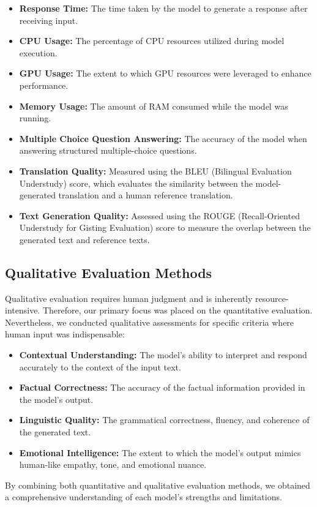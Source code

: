 \begin{itemize}
    \item \textbf{Response Time:} The time taken by the model to generate a response after receiving input.
    \item \textbf{CPU Usage:} The percentage of CPU resources utilized during model execution.
    \item \textbf{GPU Usage:} The extent to which GPU resources were leveraged to enhance performance.
    \item \textbf{Memory Usage:} The amount of RAM consumed while the model was running.
    \item \textbf{Multiple Choice Question Answering:} The accuracy of the model when answering structured multiple-choice questions.
    \item \textbf{Translation Quality:} Measured using the BLEU (Bilingual Evaluation Understudy) score, which evaluates the similarity between the model-generated translation and a human reference translation. \cite{BLUE-Score-Wikipedia}
    \item \textbf{Text Generation Quality:} Assessed using the ROUGE (Recall-Oriented Understudy for Gisting Evaluation) score to measure the overlap between the generated text and reference texts.
\end{itemize}

\cite{ROUGE-BLUE-Score}

\subsection{Qualitative Evaluation Methods}

Qualitative evaluation requires human judgment and is inherently resource-intensive. Therefore, our primary focus was placed on the quantitative evaluation. Nevertheless, we conducted qualitative assessments for specific criteria where human input was indispensable:

\begin{itemize}
    \item \textbf{Contextual Understanding:} The model's ability to interpret and respond accurately to the context of the input text.
    \item \textbf{Factual Correctness:} The accuracy of the factual information provided in the model's output.
    \item \textbf{Linguistic Quality:} The grammatical correctness, fluency, and coherence of the generated text.
    \item \textbf{Emotional Intelligence:} The extent to which the model's output mimics human-like empathy, tone, and emotional nuance.
\end{itemize}

By combining both quantitative and qualitative evaluation methods, 
we obtained a comprehensive understanding of each model's strengths and limitations.








